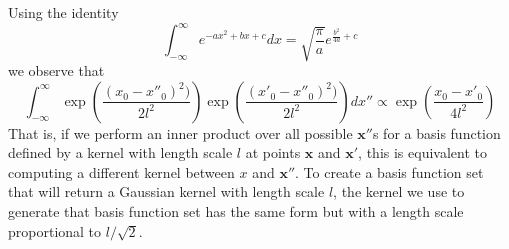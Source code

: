 \documentclass{article}
\begin{document}
Using the identity 
\begin{equation}
\label{gaussian_integral_identity}
    \int_{-\infty}^{\infty}e^{-a x^2 + b x + c}dx = \sqrt{\frac{\pi}{a}}e^{\frac{b^2}{4a}+c}
\end{equation}
we observe that 
\begin{equation}
\label{eq:gaussian_integral}
    \int_{-\infty}^{\infty}\exp\left(\frac{(x_0-x''_0)^2)}{2l^2}\right)\exp\left(\frac{(x'_0-x''_0)^2)}{2l^2}\right)dx''\propto\exp\left(\frac{x_0-x'_0}{4l^2}\right)
\end{equation}That is, if we perform an inner product over all possible $\mathbf{x}''$s for a basis function defined by a kernel with length scale $l$ at points $\mathbf{x}$ and $\mathbf{x}'$, this is equivalent to computing a different kernel between $x$ and $\mathbf{x}''$. To create a basis function set that will return a Gaussian kernel with length scale $l$, the kernel we use to generate that basis function set has the same form but with a length scale proportional to  $l/\sqrt{2}$.
\end{document}
